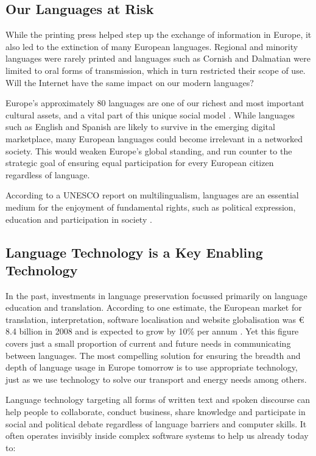 \begin{multicols}{2}
\subsection{Our Languages at Risk}

While the printing press helped step up the exchange of information in Europe, it also led to the extinction of many European languages. Regional and minority languages were rarely printed and languages such as Cornish and Dalmatian were limited to oral forms of transmission, which in turn restricted their scope of use. Will the Internet have the same impact on our modern languages?

Europe’s approximately 80 languages are one of our richest and most important cultural assets, and a vital part of this unique social model \cite{str3}. While languages such as English and Spanish are likely to survive in the emerging digital marketplace, many European languages could become irrelevant in a networked society. This would weaken Europe’s global standing, and run counter to the strategic goal of ensuring equal participation for every European citizen regardless of language.


According to a UNESCO report on multilingualism, languages are an essential medium for the enjoyment of fundamental rights, such as political expression, education and participation in society \cite{str4}.
\vfill

\subsection{Language Technology is a Key Enabling Technology}

In the past, investments in language preservation focussed primarily on language education and translation. According to one estimate, the European market for translation, interpretation, software localisation and website globalisation was € 8.4 billion in 2008 and is expected to grow by 10\% per annum \cite{str5}. Yet this figure covers just a small proportion of current and future needs in communicating between languages. The most compelling solution for ensuring the breadth and depth of language usage in Europe tomorrow is to use appropriate technology, just as we use technology to solve our transport and energy needs among others.

Language technology targeting all forms of written text and spoken discourse can help people to collaborate, conduct business, share knowledge and participate in social and political debate regardless of language barriers and computer skills. It often operates invisibly inside complex software systems to help us already today to:


\end{multicols}

